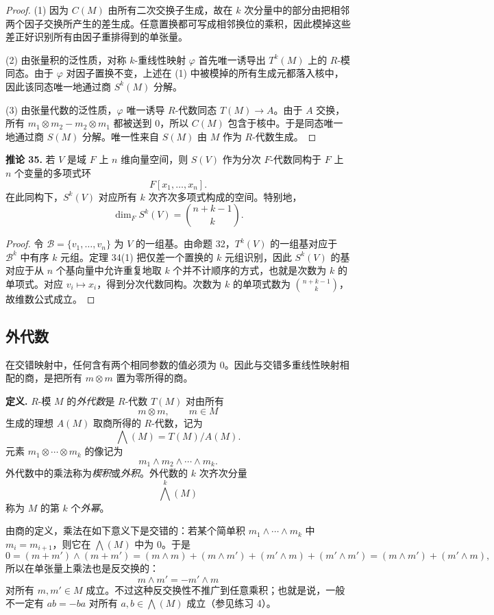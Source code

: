 \begin{proof}
(1) 因为 $C(M)$ 由所有二次交换子生成，故在 $k$ 次分量中的部分由把相邻两个因子交换所产生的差生成。任意置换都可写成相邻换位的乘积，因此模掉这些差正好识别所有由因子重排得到的单张量。

(2) 由张量积的泛性质，对称 $k$-重线性映射 $\varphi$ 首先唯一诱导出 $T^k(M)$ 上的 $R$-模同态。由于 $\varphi$ 对因子置换不变，上述在 (1) 中被模掉的所有生成元都落入核中，因此该同态唯一地通过商 $S^k(M)$ 分解。

(3) 由张量代数的泛性质，$\varphi$ 唯一诱导 $R$-代数同态 $T(M)\to A$。由于 $A$ 交换，所有 $m_1\otimes m_2-m_2\otimes m_1$ 都被送到 $0$，所以 $C(M)$ 包含于核中。于是同态唯一地通过商 $S(M)$ 分解。唯一性来自 $S(M)$ 由 $M$ 作为 $R$-代数生成。
\end{proof}

\noindent\textbf{推论 35.} 若 $V$ 是域 $F$ 上 $n$ 维向量空间，则 $S(V)$ 作为分次 $F$-代数同构于 $F$ 上 $n$ 个变量的多项式环
\[
F[x_1,
\ldots,x_n].
\]
在此同构下，$S^k(V)$ 对应所有 $k$ 次齐次多项式构成的空间。特别地，
\[
\dim_F S^k(V)=\binom{n+k-1}{k}.
\]

\begin{proof}
令 $\mathcal B=\{v_1,
\ldots,v_n\}$ 为 $V$ 的一组基。由命题 32，$T^k(V)$ 的一组基对应于 $\mathcal B^k$ 中有序 $k$ 元组。定理 34(1) 把仅差一个置换的 $k$ 元组识别，因此 $S^k(V)$ 的基对应于从 $n$ 个基向量中允许重复地取 $k$ 个并不计顺序的方式，也就是次数为 $k$ 的单项式。对应 $v_i\mapsto x_i$，得到分次代数同构。次数为 $k$ 的单项式数为 $\binom{n+k-1}{k}$，故维数公式成立。
\end{proof}

\subsection*{外代数}

在交错映射中，任何含有两个相同参数的值必须为 $0$。因此与交错多重线性映射相配的商，是把所有 $m\otimes m$ 置为零所得的商。

\noindent\textbf{定义.} $R$-模 $M$ 的\emph{外代数}是 $R$-代数 $T(M)$ 对由所有
\[
m\otimes m,
\qquad m\in M
\]
生成的理想 $A(M)$ 取商所得的 $R$-代数，记为
\[
\bigwedge(M)=T(M)/A(M).
\]
元素 $m_1\otimes\cdots\otimes m_k$ 的像记为
\[
m_1\wedge m_2\wedge\cdots\wedge m_k.
\]
外代数中的乘法称为\emph{楔积}或\emph{外积}。外代数的 $k$ 次齐次分量
\[
\bigwedge^k(M)
\]
称为 $M$ 的第 $k$ 个\emph{外幂}。

由商的定义，乘法在如下意义下是交错的：若某个简单积 $m_1\wedge\cdots\wedge m_k$ 中 $m_i=m_{i+1}$，则它在 $\bigwedge(M)$ 中为 $0$。于是
\[
0=(m+m')\wedge(m+m')
=(m\wedge m)+(m\wedge m')+(m'\wedge m)+(m'\wedge m')
=(m\wedge m')+(m'\wedge m),
\]
所以在单张量上乘法也是反交换的：
\[
m\wedge m'=-m'\wedge m
\]
对所有 $m,m'\in M$ 成立。不过这种反交换性不推广到任意乘积；也就是说，一般不一定有 $ab=-ba$ 对所有 $a,b\in\bigwedge(M)$ 成立（参见练习 4）。

